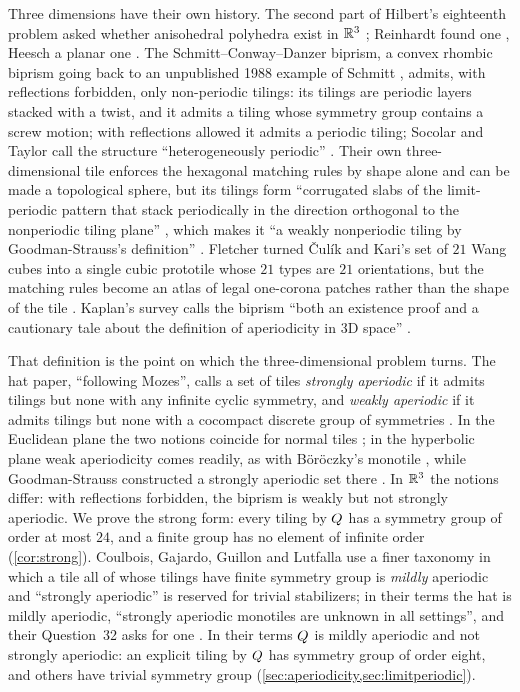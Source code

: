Three dimensions have their own history. The second part of Hilbert's eighteenth problem asked
whether anisohedral polyhedra exist in $\mathbb{R}^3$ \cite{Hil02}; Reinhardt found one \cite{Rei28},
Heesch a planar one \cite{Hee35}. The Schmitt--Conway--Danzer biprism, a convex rhombic biprism
going back to an unpublished 1988 example of Schmitt \cite{Sen96,Rad20}, admits, with reflections
forbidden, only non-periodic tilings: its tilings are periodic layers stacked with a twist, and it
admits a tiling whose symmetry group contains a screw motion; with reflections allowed it admits
a periodic tiling; Socolar and Taylor call the structure ``heterogeneously periodic'' \cite{ST12}. Their own three-dimensional tile enforces the
hexagonal matching rules by shape alone and can be made a topological sphere, but its tilings form
``corrugated slabs of the limit-periodic pattern that stack periodically in the direction
orthogonal to the nonperiodic tiling plane'' \cite{ST11}, which makes it ``a weakly nonperiodic
tiling by Goodman-Strauss's definition'' \cite{ST12}. Fletcher turned \v{C}ul\'ik and Kari's set of
$21$ Wang cubes \cite{CK95} into a single cubic prototile whose $21$ types are $21$ orientations,
but the matching rules become an atlas of legal one-corona patches rather than the shape of the
tile \cite{Fle10}. Kaplan's survey
calls the biprism ``both an existence proof and a cautionary tale about the definition of
aperiodicity in 3D space'' \cite{Kap25}.

That definition is the point on which the three-dimensional problem turns. The hat paper,
``following Mozes'', calls a set of tiles \emph{strongly aperiodic} if it admits tilings but none
with any infinite cyclic symmetry, and \emph{weakly aperiodic} if it admits tilings but none with
a cocompact discrete group of symmetries \cite{SMKGS24,Moz97}. In the Euclidean plane the two
notions coincide for normal tiles \cite[Theorem~3.7.1]{GS16}; in the hyperbolic plane weak
aperiodicity comes readily, as with B\"or\"oczky's monotile \cite{Bor74}, while Goodman-Strauss
constructed a strongly aperiodic set there \cite{GS05}. In $\mathbb{R}^3$ the notions differ: with
reflections forbidden, the biprism is weakly but not strongly aperiodic. We prove the strong form: every tiling by $Q$ has a symmetry group of
order at most $24$, and a finite group has no element of infinite order (\cref{cor:strong}). Coulbois, Gajardo,
Guillon and Lutfalla use a finer taxonomy in which a tile all of whose tilings have finite
symmetry group is \emph{mildly} aperiodic and ``strongly aperiodic'' is reserved for trivial
stabilizers; in their terms the hat is mildly aperiodic, ``strongly aperiodic monotiles are
unknown in all settings'', and their Question~32 asks for one \cite{CGGL24}. In their terms
$Q$ is mildly aperiodic and not strongly aperiodic: an explicit tiling by $Q$ has
symmetry group of order eight, and others have trivial symmetry group
(\cref{sec:aperiodicity,sec:limitperiodic}).

